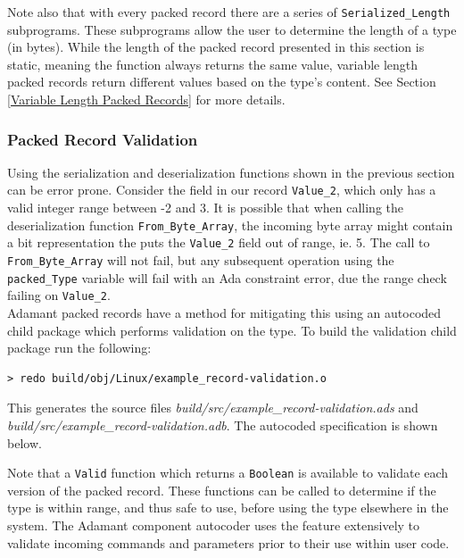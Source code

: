 Note also that with every packed record there are a series of \texttt{Serialized\_Length} subprograms. These subprograms allow the user to determine the length of a type (in bytes). While the length of the packed record presented in this section is static, meaning the function always returns the same value, variable length packed records return different values based on the type's content. See Section \ref{Variable Length Packed Records} for more details.

\subsubsection{Packed Record Validation} \label{Packed Record Validation}

Using the serialization and deserialization functions shown in the previous section can be error prone. Consider the field in our record \texttt{Value\_2}, which only has a valid integer range between -2 and 3. It is possible that when calling the deserialization function \texttt{From\_Byte\_Array}, the incoming byte array might contain a bit representation the puts the \texttt{Value\_2} field out of range, ie. 5. The call to \texttt{From\_Byte\_Array} will not fail, but any subsequent operation using the \texttt{packed\_Type} variable will fail with an Ada constraint error, due the range check failing on \texttt{Value\_2}. \\

Adamant packed records have a method for mitigating this using an autocoded child package which performs validation on the type. To build the validation child package run the following:

\vspace{5mm} %
\begin{verbatim}
> redo build/obj/Linux/example_record-validation.o
\end{verbatim}
\vspace{5mm} %

This generates the source files \textit{build/src/example\_record-validation.ads} and \textit{build/src/example\_record-validation.adb}. The autocoded specification is shown below.


Note that a \texttt{Valid} function which returns a \texttt{Boolean} is available to validate each version of the packed record. These functions can be called to determine if the type is within range, and thus safe to use, before using the type elsewhere in the system. The Adamant component autocoder uses the feature extensively to validate incoming commands and parameters prior to their use within user code.\\

